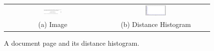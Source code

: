 
\begin{figure}[h]
\center\footnotesize 
\begin{tabular}{|c|c|}
\hline
 \includegraphics[width=0.2\textwidth]{simage.png} &
 \includegraphics[width=0.2\textwidth]{histogram.png} \\
 (a) Image & (b) Distance Histogram\\
 \hline
\end{tabular}
\caption{ A document page and its distance histogram.}
\label{hist} 
\end{figure} 

